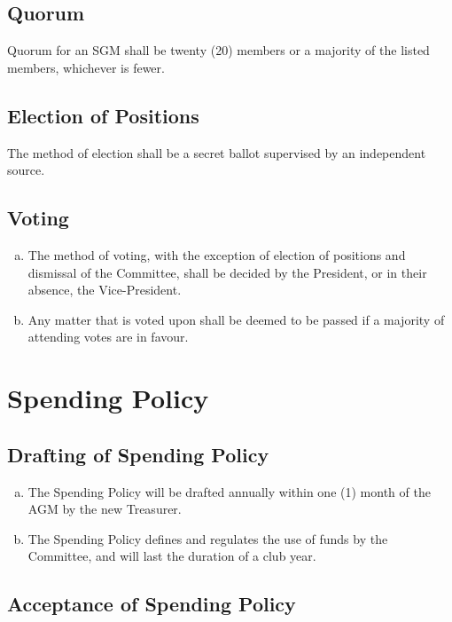 \documentclass[a4paper,12pt]{article}
\begin{document}
\subsection{Quorum}

Quorum for an SGM shall be twenty (20) members or a majority of the listed members, whichever is fewer.

\subsection{Election of Positions}

The method of election shall be a secret ballot supervised by an independent source.

\subsection{Voting}

\begin{enumerate}[a)]
	\item The method of voting, with the exception of election of positions and dismissal of the Committee, shall be decided by the President, or in their absence, the Vice-President.
	\item Any matter that is voted upon shall be deemed to be passed if a majority of attending votes are in favour.
\end{enumerate}

\section{Spending Policy}

\subsection{Drafting of Spending Policy}

\begin{enumerate}[a)]
	\item The Spending Policy will be drafted annually within one (1) month of the AGM by the new Treasurer.
	\item The Spending Policy defines and regulates the use of funds by the Committee, and will last the duration of a club year.
\end{enumerate}

\subsection{Acceptance of Spending Policy}
\end{document}
